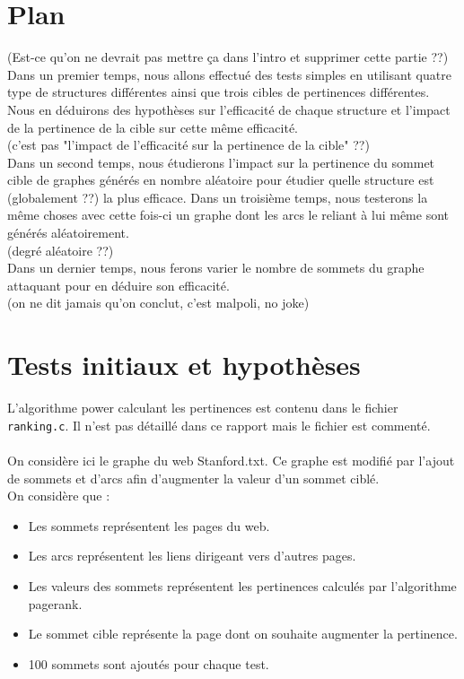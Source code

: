 \documentclass[a4paper,11pt]{article}
\begin{document}
\section{Plan}
	(Est-ce qu'on ne devrait pas mettre ça dans l'intro et supprimer cette partie ??)\\
	Dans un premier temps, nous allons effectué des tests simples en utilisant quatre type de structures différentes ainsi que trois cibles de pertinences différentes.
	Nous en déduirons des hypothèses sur l'efficacité de chaque structure et l'impact de la pertinence de la cible sur cette même efficacité.\\(c'est pas "l'impact de l'efficacité sur la pertinence de la cible" ??)\\
	Dans un second temps, nous étudierons l'impact sur la pertinence du sommet cible de graphes générés en nombre aléatoire pour étudier quelle structure est (globalement ??) la plus efficace.
	Dans un troisième temps, nous testerons la même choses avec cette fois-ci un graphe dont les arcs le reliant à lui même sont générés aléatoirement. \\(degré aléatoire ??)\\
	Dans un dernier temps, nous ferons varier le nombre de sommets du graphe attaquant pour en déduire son efficacité.\\(on ne dit jamais qu'on conclut, c'est malpoli, no joke)\\
	
\section{Tests initiaux et hypothèses}
	L'algorithme power calculant les pertinences est contenu dans le fichier \texttt{ranking.c}. Il n'est pas détaillé dans ce rapport mais le fichier est commenté.\\
	\\
	On considère ici le graphe du web Stanford.txt. Ce graphe est modifié par l'ajout de sommets et d'arcs afin d'augmenter la valeur d'un sommet ciblé.\\
	On considère que :\\
	\begin{itemize}
		\item Les sommets représentent les pages du web.
		\item Les arcs représentent les liens dirigeant vers d'autres pages.
		\item Les valeurs des sommets représentent les pertinences calculés par l'algorithme pagerank.
		\item Le sommet cible représente la page dont on souhaite augmenter la pertinence.
		\item 100 sommets sont ajoutés pour chaque test.
	\end{itemize}
\end{document}

